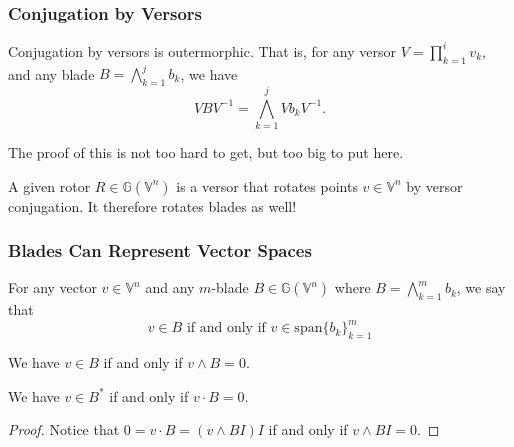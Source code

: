 \documentclass{beamer}
\newcommand{\G}{\mathbb{G}}
\newcommand{\V}{\mathbb{V}}
\begin{document}
\begin{frame}
\frametitle{Conjugation by Versors}
\begin{lemma}
Conjugation by versors is outermorphic.  That is, for any versor $V=\prod_{k=1}^i v_k$,
and any blade $B=\bigwedge_{k=1}^j b_k$, we have
\begin{equation*}
VBV^{-1} = \bigwedge_{k=1}^j Vb_kV^{-1}.
\end{equation*}
\end{lemma}
The proof of this is not too hard to get, but too big to put here.
\begin{example}
A given rotor $R\in\G(\V^n)$ is a versor that rotates points $v\in\V^n$
by versor conjugation.  It therefore rotates blades as well!
\end{example}
\end{frame}

\begin{frame}
\frametitle{Blades Can Represent Vector Spaces}
\begin{definition}
For any vector $v\in\V^n$ and any $m$-blade $B\in\G(\V^n)$ where $B=\bigwedge_{k=1}^m b_k$, we
say that
\begin{equation*}
\mbox{$v\in B$ if and only if $v\in\mbox{span}\{b_k\}_{k=1}^m$}
\end{equation*}
\end{definition}
\begin{lemma}
We have $v\in B$ if and only if $v\wedge B=0$.
\end{lemma}
\begin{lemma}
We have $v\in B^*$ if and only if $v\cdot B=0$.
\end{lemma}
\begin{proof}
Notice that $0=v\cdot B = (v\wedge BI)I$ if and only if $v\wedge BI=0$.
\end{proof}
\end{frame}

\end{document}
